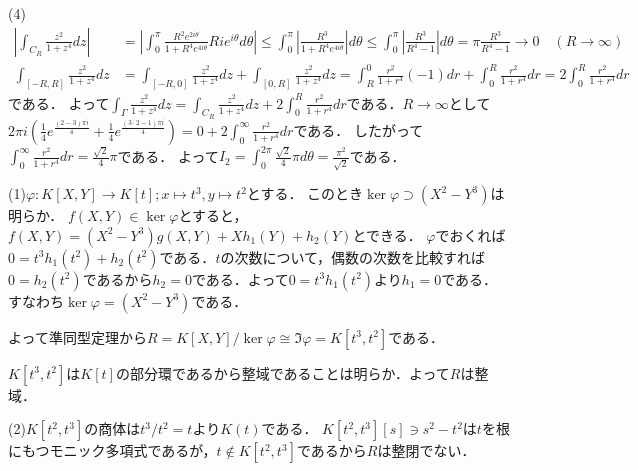 \documentclass[
		book,
		head_space=20mm,
		foot_space=20mm,
		gutter=10mm,
		line_length=190mm
]{jlreq}
\begin{document}
(4)\begin{align}
	\left| \int_{C_R} \frac{z^2}{1+z^4}dz \right|&=\left| \int_0^\pi \frac{R^2e^{2i \theta}}{1+R^4e^{4 i\theta}} Rie^{i\theta}d\theta \right|\le \int_0^\pi \left| \frac{R^{3}}{1+R^4e^{4i\theta}} \right|d\theta\le \int_0^\pi \left| \frac{R^{3}}{R^4-1} \right|d\theta=\pi \frac{R^{3}}{R^4-1}\rightarrow 0 \quad(R\to \infty)\\
	\int_{[-R,R]}\frac{z^2}{1+z^4}dz&=\int_{[-R,0]}\frac{z^2}{1+z^4}dz+\int_{[0,R]}\frac{z^2}{1+z^4}dz=\int_{R}^0 \frac{r^2}{1+r^4}(-1)dr+\int_0^R \frac{r^2}{1+r^4}dr=2\int_0^R \frac{r^2}{1+r^4}dr
\end{align}
である．
よって$\int_{\Gamma} \frac{z^2}{1+z^4}dz= \int_{C_R} \frac{z^2}{1+z^4}dz+2\int_0^R \frac{r^2}{1+r^4}dr$である．$R\to \infty$として$2\pi i (\frac{1}{4}e^{\frac{(2-3)\pi i}{4}}+\frac{1}{4}e^{\frac{(3\cdot2-1)\pi i}{4}})=0+2\int_0^\infty \frac{r^2}{1+r^4}dr$である．
したがって$\int_0^\infty \frac{r^2}{1+r^4}dr=\frac{\sqrt{2}}{4}\pi$である．
よって$I_2=\int_0^{2\pi}\frac{\sqrt{2}}{4}\pi d\theta=\frac{\pi^2}{\sqrt{2}}$である．

(1)$\varphi\colon K[X,Y]\rightarrow K[t];x\mapsto t^3,y\mapsto t^2$とする．
このとき$\ker \varphi\supset (X^2-Y^3)$は明らか．
$f(X,Y)\in \ker \varphi$とすると，$f(X,Y)=(X^2-Y^3)g(X,Y)+Xh_1(Y)+h_2(Y)$とできる．
$\varphi$でおくれば$0=t^3h_1(t^2)+h_2(t^2)$である．$t$の次数について，偶数の次数を比較すれば$0=h_2(t^2)$であるから$h_2=0$である．よって$0=t^3h_1(t^2)$より$h_1=0$である．
すなわち$\ker \varphi=(X^2-Y^3)$である．

よって準同型定理から$R=K[X,Y]/\ker\varphi\cong \Im \varphi=K[t^3,t^2]$である．

$K[t^3,t^2]$は$K[t]$の部分環であるから整域であることは明らか．よって$R$は整域．

(2)$K[t^2,t^3]$の商体は$t^3/t^2=t$より$K(t)$である．
$K[t^2,t^3][s]\ni s^2-t^2$は$t$を根にもつモニック多項式であるが，$t\notin K[t^2,t^3]$であるから$R$は整閉でない．
\end{document}
